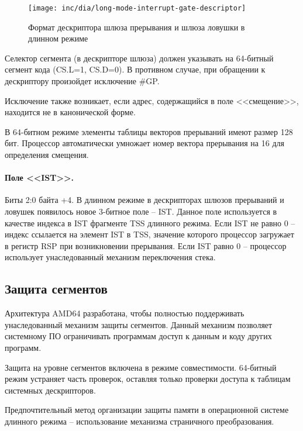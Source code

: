 \begin{figure}[ht!]
  \centering
  \texttt{[image: inc/dia/long-mode-interrupt-gate-descriptor]}
  \caption{Формат дескриптора шлюза прерывания и шлюза ловушки в длинном режиме}
  \label{fig:long-mode-interrupt-gate-descriptor}
\end{figure}

Селектор сегмента (в дескрипторе шлюза) должен указывать на 64-битный сегмент кода (CS.L=1, CS.D=0).
В противном случае, при обращении к дескриптору произойдет исключение \#GP.

Исключение также возникает, если адрес, содержащийся в поле <<смещение>>, находится не в канонической форме.

В 64-битном режиме элементы таблицы векторов прерываний имеют размер 128 бит. Процессор автоматически
умножает номер вектора прерывания на 16 для определения смещения.

\paragraph{Поле <<IST>>.} Биты 2:0 байта +4. В длинном режиме в дескрипторах шлюзов прерываний и ловушек
появилось новое 3-битное поле -- IST. Данное поле используется в качестве индекса в IST фрагменте TSS длинного режима.
Если IST не равно 0 -- индекс ссылается на элемент IST в TSS, значение которого процессор загружает в регистр RSP при
возникновении прерывания. Если IST равно 0 -- процессор использует унаследованный механизм переключения стека.

\subsection{Защита сегментов}
Архитектура AMD64 разработана, чтобы полностью поддерживать унаследованный механизм защиты сегментов.
Данный механизм позволяет системному ПО ограничивать программам доступ к данным и коду других программ.

Защита на уровне сегментов включена в режиме совместимости. 64-битный режим устраняет часть проверок,
оставляя только проверки доступа к таблицам системных дескрипторов.

Предпочтительный метод организации защиты памяти в операционной системе длинного режима -- использование
механизма страничного преобразования.

